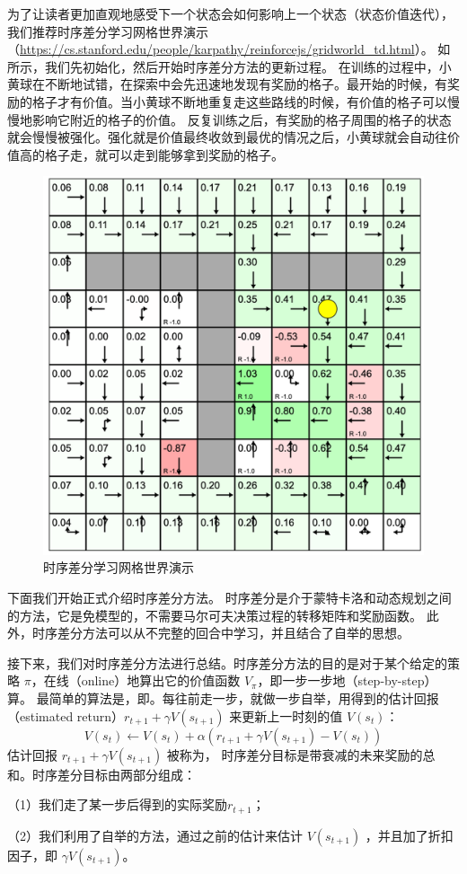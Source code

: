 为了让读者更加直观地感受下一个状态会如何影响上一个状态（状态价值迭代），我们推荐时序差分学习网格世界演示（\url{https://cs.stanford.edu/people/karpathy/reinforcejs/gridworld_td.html}）。
如 所示，我们先初始化，然后开始时序差分方法的更新过程。
在训练的过程中，小黄球在不断地试错，在探索中会先迅速地发现有奖励的格子。最开始的时候，有奖励的格子才有价值。当小黄球不断地重复走这些路线的时候，有价值的格子可以慢慢地影响它附近的格子的价值。
反复训练之后，有奖励的格子周围的格子的状态就会慢慢被强化。强化就是价值最终收敛到最优的情况之后，小黄球就会自动往价值高的格子走，就可以走到能够拿到奖励的格子。

\begin{figure}[htb]
	\centering
	\includegraphics[width=0.3\linewidth]{res/ch3/3.13}
	\caption{时序差分学习网格世界演示}
	\label{fig:fig3.13}
\end{figure}

下面我们开始正式介绍时序差分方法。
时序差分是介于蒙特卡洛和动态规划之间的方法，它是免模型的，不需要马尔可夫决策过程的转移矩阵和奖励函数。
此外，时序差分方法可以从不完整的回合中学习，并且结合了自举的思想。

接下来，我们对时序差分方法进行总结。时序差分方法的目的是对于某个给定的策略 $\pi$，在线（online）地算出它的价值函数 $V_{\pi}$，即一步一步地（step-by-step）算。
最简单的算法是，即。每往前走一步，就做一步自举，用得到的估计回报（estimated return）$r_{t+1}+\gamma V(s_{t+1})$ 来更新上一时刻的值 $V(s_t)$：
	\begin{equation}
		\label{eq:td_update}
		V\left(s_{t}\right) \leftarrow V\left(s_{t}\right)+\alpha\left(r_{t+1}+\gamma V\left(s_{t+1}\right)-V\left(s_{t}\right)\right)
	\end{equation}
估计回报 $r_{t+1}+\gamma V(s_{t+1})$ 被称为，
时序差分目标是带衰减的未来奖励的总和。时序差分目标由两部分组成：

（1）我们走了某一步后得到的实际奖励$r_{t+1}$；

（2）我们利用了自举的方法，通过之前的估计来估计 $V(s_{t+1})$  ，并且加了折扣因子，即 $\gamma V(s_{t+1})$。
  
